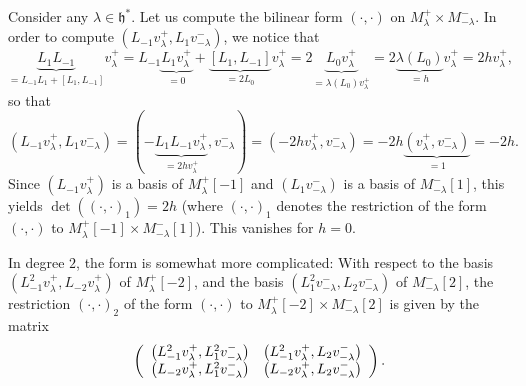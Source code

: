 \documentclass
[numbers=enddot,12pt,final,onecolumn,german,notitlepage]{scrartcl}%
\theoremstyle{definition}
\begin{document}
Consider any $\lambda\in\mathfrak{h}^{\ast}$. Let us compute the bilinear form
$\left(  \cdot,\cdot\right)  $ on $M_{\lambda}^{+}\times M_{-\lambda}^{-}$. In
order to compute $\left(  L_{-1}v_{\lambda}^{+},L_{1}v_{-\lambda}^{-}\right)
$, we notice that
\[
\underbrace{L_{1}L_{-1}}_{=L_{-1}L_{1}+\left[  L_{1},L_{-1}\right]
}v_{\lambda}^{+}=L_{-1}\underbrace{L_{1}v_{\lambda}^{+}}_{=0}%
+\underbrace{\left[  L_{1},L_{-1}\right]  }_{=2L_{0}}v_{\lambda}%
^{+}=2\underbrace{L_{0}v_{\lambda}^{+}}_{=\lambda\left(  L_{0}\right)
v_{\lambda}^{+}}=2\underbrace{\lambda\left(  L_{0}\right)  }_{=h}v_{\lambda
}^{+}=2hv_{\lambda}^{+},
\]
so that%
\[
\left(  L_{-1}v_{\lambda}^{+},L_{1}v_{-\lambda}^{-}\right)  =\left(
-\underbrace{L_{1}L_{-1}v_{\lambda}^{+}}_{=2hv_{\lambda}^{+}},v_{-\lambda}%
^{-}\right)  =\left(  -2hv_{\lambda}^{+},v_{-\lambda}^{-}\right)
=-2h\underbrace{\left(  v_{\lambda}^{+},v_{-\lambda}^{-}\right)  }_{=1}=-2h.
\]
Since $\left(  L_{-1}v_{\lambda}^{+}\right)  $ is a basis of $M_{\lambda}%
^{+}\left[  -1\right]  $ and $\left(  L_{1}v_{-\lambda}^{-}\right)  $ is a
basis of $M_{-\lambda}^{-}\left[  1\right]  $, this yields $\det\left(
\left(  \cdot,\cdot\right)  _{1}\right)  =2h$ (where $\left(  \cdot
,\cdot\right)  _{1}$ denotes the restriction of the form $\left(  \cdot
,\cdot\right)  $ to $M_{\lambda}^{+}\left[  -1\right]  \times M_{-\lambda}%
^{-}\left[  1\right]  $). This vanishes for $h=0$.

In degree $2$, the form is somewhat more complicated: With respect to the
basis $\left(  L_{-1}^{2}v_{\lambda}^{+},L_{-2}v_{\lambda}^{+}\right)  $ of
$M_{\lambda}^{+}\left[  -2\right]  $, and the basis $\left(  L_{1}%
^{2}v_{-\lambda}^{-},L_{2}v_{-\lambda}^{-}\right)  $ of $M_{-\lambda}%
^{-}\left[  2\right]  $, the restriction $\left(  \cdot,\cdot\right)  _{2}$ of
the form $\left(  \cdot,\cdot\right)  $ to $M_{\lambda}^{+}\left[  -2\right]
\times M_{-\lambda}^{-}\left[  2\right]  $ is given by the matrix%
\[
\left(
\begin{array}
[c]{cc}%
\left(  L_{-1}^{2}v_{\lambda}^{+},L_{1}^{2}v_{-\lambda}^{-}\right)  & \left(
L_{-1}^{2}v_{\lambda}^{+},L_{2}v_{-\lambda}^{-}\right) \\
\left(  L_{-2}v_{\lambda}^{+},L_{1}^{2}v_{-\lambda}^{-}\right)  & \left(
L_{-2}v_{\lambda}^{+},L_{2}v_{-\lambda}^{-}\right)
\end{array}
\right)  .
\]
\end{document}
